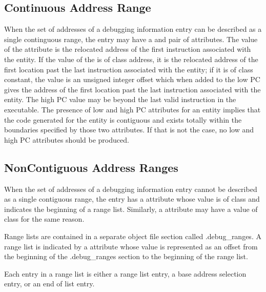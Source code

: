 \subsection{Continuous Address Range}
\label{chap:contiguousaddressranges}
When the set of addresses of a debugging information entry can
be described as a single continguous range, the entry may have
a  and  pair of attributes. The value
of the  attribute is the relocated address of the
first instruction associated with the entity. If the value of
the  is of class address, it is the relocated
address of the first location past the last instruction
associated with the entity; if it is of class constant, the
value is an unsigned integer offset which when added to the
low PC gives the address of the first location past the last
instruction associated with the entity.  The high PC value
may be beyond the last valid instruction in the executable.
The presence of low and high PC attributes for an entity
implies that the code generated for the entity is contiguous
and exists totally within the boundaries specified by those
two attributes. If that is not the case, no low and high PC
attributes should be produced.

\subsection{Non\dash Contiguous Address Ranges}
\label{chap:noncontiguousaddressranges}
When the set of addresses of a debugging information entry
cannot be described as a single contiguous range, the entry has
a  attribute whose value is of class 
and indicates the beginning of a range list. Similarly,
a  attribute may have a value of class
 for the same reason.  

Range lists are contained
in a separate object file section called .debug\_ranges. A
range list is indicated by a  attribute whose
value is represented as an offset from the beginning of the
.debug\_ranges section to the beginning of the range list.

Each entry in a range list is either a range list entry,
a base address selection entry, or an end of list entry.

